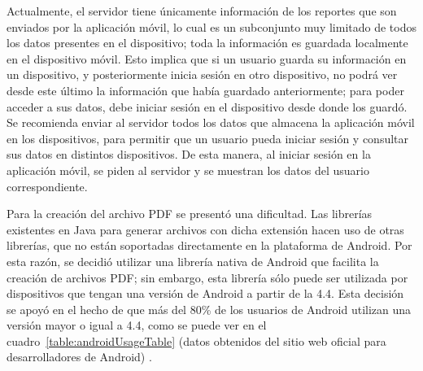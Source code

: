 Actualmente, el servidor tiene únicamente información de los reportes que son enviados por la aplicación móvil, lo cual es un subconjunto  muy limitado de todos los datos presentes en el dispositivo; toda la información es guardada localmente en el dispositivo móvil. Esto implica que si un usuario guarda su información en un dispositivo, y posteriormente inicia sesión en otro dispositivo, no podrá ver desde este último la información que había guardado anteriormente; para poder acceder a sus datos, debe iniciar sesión en el dispositivo desde donde los guardó. Se recomienda enviar al servidor todos los datos que almacena la aplicación móvil en los dispositivos, para permitir que un usuario pueda iniciar sesión y consultar sus datos en distintos dispositivos. De esta manera, al iniciar sesión en la aplicación móvil, se piden al servidor y se muestran los datos del usuario correspondiente. 


Para la creación del archivo PDF se presentó una dificultad. Las librerías existentes en Java para generar archivos con dicha extensión hacen uso de otras librerías, que no están soportadas directamente en la plataforma de Android. Por esta razón, se decidió utilizar una librería nativa de Android que facilita la creación de archivos PDF; sin embargo, esta librería sólo puede ser utilizada por dispositivos que tengan una versión de Android a partir de la 4.4. Esta decisión se apoyó en el hecho de que más del 80\% de los usuarios de Android utilizan una versión mayor o igual a 4.4, como se puede ver en el cuadro~\ref{table:androidUsageTable} (datos obtenidos del sitio web oficial para desarrolladores de Android) \cite{USG1}. 

